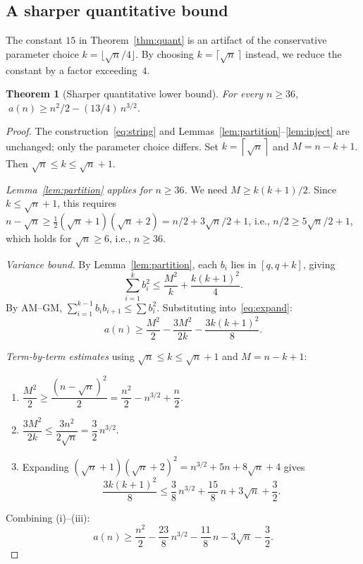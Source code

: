 \documentclass[11pt,a4paper]{article}
\theoremstyle{plain}
\newtheorem{theorem}{Theorem}[section]
\theoremstyle{definition}
\theoremstyle{remark}
\newcommand{\ceil}[1]{\left\lceil #1 \right\rceil}
\begin{document}
\subsection{A sharper quantitative bound}

The constant $15$ in Theorem~\ref{thm:quant} is an artifact of the
conservative parameter choice $k = \lfloor\sqrt{n}/4\rfloor$.  By
choosing $k = \lceil\sqrt{n}\,\rceil$ instead, we reduce the constant
by a factor exceeding~$4$.

\begin{theorem}[Sharper quantitative lower bound]\label{thm:quant-sharp}
  For every $n \ge 36$,
  $\;a(n) \ge n^2/2 - (13/4)\,n^{3/2}$.
\end{theorem}

\begin{proof}
  The construction~\eqref{eq:string} and
  Lemmas~\ref{lem:partition}--\ref{lem:inject} are unchanged; only
  the parameter choice differs.  Set $k = \ceil{\sqrt{n}}$ and
  $M = n - k + 1$.  Then $\sqrt{n} \le k \le \sqrt{n} + 1$.

  \textit{Lemma~\ref{lem:partition} applies for $n \ge 36$.}
  We need $M \ge k(k{+}1)/2$.  Since $k \le \sqrt{n} + 1$, this
  requires $n - \sqrt{n} \ge \frac{1}{2}(\sqrt{n}+1)(\sqrt{n}+2)
  = n/2 + 3\sqrt{n}/2 + 1$, i.e., $n/2 \ge 5\sqrt{n}/2 + 1$, which holds for
  $\sqrt{n} \ge 6$, i.e., $n \ge 36$.

  \textit{Variance bound.}  By Lemma~\ref{lem:partition}, each $b_i$
  lies in $[q, q{+}k]$, giving
  \begin{equation}\label{eq:sumsq-sharp}
    \sum_{i=1}^k b_i^2
    \le \frac{M^2}{k} + \frac{k(k{+}1)^2}{4}.
  \end{equation}
  By AM--GM,
  $\sum_{i=1}^{k-1} b_i b_{i+1} \le \sum b_i^2$.
  Substituting into~\eqref{eq:expand}:
  \[
    a(n) \ge \frac{M^2}{2}
      - \frac{3M^2}{2k} - \frac{3k(k{+}1)^2}{8}.
  \]

  \textit{Term-by-term estimates} using
  $\sqrt{n} \le k \le \sqrt{n} + 1$ and $M = n - k + 1$:
  \begin{enumerate}[label=(\roman*),nosep]
    \item $\dfrac{M^2}{2} \ge \dfrac{(n - \sqrt{n})^2}{2}
      = \dfrac{n^2}{2} - n^{3/2} + \dfrac{n}{2}$.
    \item $\dfrac{3M^2}{2k} \le \dfrac{3n^2}{2\sqrt{n}} = \dfrac{3}{2}\,n^{3/2}$.
    \item Expanding $(\sqrt{n}+1)(\sqrt{n}+2)^2 = n^{3/2} + 5n + 8\sqrt{n} + 4$
      gives
      \[
        \frac{3k(k{+}1)^2}{8}
        \le \frac{3}{8}\,n^{3/2} + \frac{15}{8}\,n + 3\sqrt{n} + \frac{3}{2}.
      \]
  \end{enumerate}
  Combining (i)--(iii):
  \begin{equation}\label{eq:lb-allterms}
    a(n) \ge \frac{n^2}{2} - \frac{23}{8}\,n^{3/2}
      - \frac{11}{8}\,n - 3\sqrt{n} - \frac{3}{2}.
  \end{equation}


\end{proof}
\end{document}
